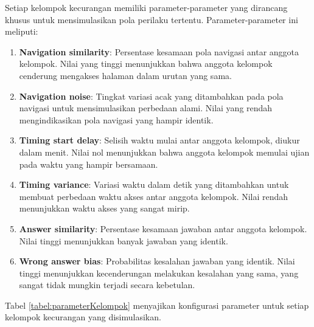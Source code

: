 Setiap kelompok kecurangan memiliki parameter-parameter yang dirancang khusus untuk mensimulasikan pola perilaku tertentu. Parameter-parameter ini meliputi:

\begin{enumerate}
    \item \textbf{Navigation similarity}: Persentase kesamaan pola navigasi antar anggota kelompok. Nilai yang tinggi menunjukkan bahwa anggota kelompok cenderung mengakses halaman dalam urutan yang sama.
    
    \item \textbf{Navigation noise}: Tingkat variasi acak yang ditambahkan pada pola navigasi untuk mensimulasikan perbedaan alami. Nilai yang rendah mengindikasikan pola navigasi yang hampir identik.
    
    \item \textbf{Timing start delay}: Selisih waktu mulai antar anggota kelompok, diukur dalam menit. Nilai nol menunjukkan bahwa anggota kelompok memulai ujian pada waktu yang hampir bersamaan.
    
    \item \textbf{Timing variance}: Variasi waktu dalam detik yang ditambahkan untuk membuat perbedaan waktu akses antar anggota kelompok. Nilai rendah menunjukkan waktu akses yang sangat mirip.
    
    \item \textbf{Answer similarity}: Persentase kesamaan jawaban antar anggota kelompok. Nilai tinggi menunjukkan banyak jawaban yang identik.
    
    \item \textbf{Wrong answer bias}: Probabilitas kesalahan jawaban yang identik. Nilai tinggi menunjukkan kecenderungan melakukan kesalahan yang sama, yang sangat tidak mungkin terjadi secara kebetulan.
\end{enumerate}

Tabel \ref{tabel:parameterKelompok} menyajikan konfigurasi parameter untuk setiap kelompok kecurangan yang disimulasikan.


